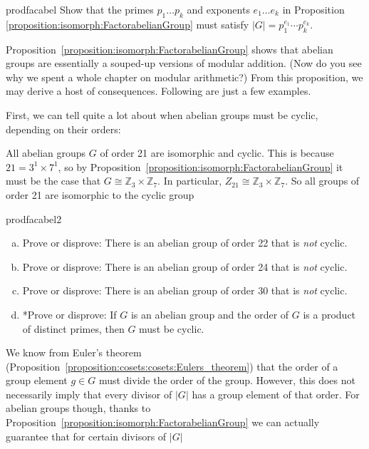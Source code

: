 \begin{exercise}{prodfacabel}
Show that the primes  $p_1 \ldots p_k$ and exponents $e_1 \ldots e_k$ in Proposition~ \ref{proposition:isomorph:FactorabelianGroup} must satisfy
$|G| = p_1^{e_1} \cdots p_k^{e_k}$.
\end{exercise}

Proposition~\ref{proposition:isomorph:FactorabelianGroup} shows that abelian groups are essentially a souped-up versions of modular addition.  (Now do you see why we spent a whole chapter on modular arithmetic?) From this proposition, we may derive a host of consequences.  Following are just a few examples.

First, we can tell quite a lot about when abelian groups must be cyclic, depending on their orders:

\begin{example}{}  All abelian groups $G$ of order 21 are isomorphic and cyclic. This is because $21 = 3^1 \times 7^1$, so by Proposition~\ref{proposition:isomorph:FactorabelianGroup} it must be the case that $G \cong {\mathbb Z}_3 \times {\mathbb Z}_7$. In particular,
 $Z_{21}  \cong {\mathbb Z}_3 \times {\mathbb Z}_7$. So all groups of order 21 are isomorphic to the cyclic group 
\end{example}

\begin{exercise}{prodfacabel2}
\begin{enumerate}[(a)] 
\item
Prove or disprove: There is an abelian group of order 22 that is \emph{not} cyclic. 
\item
Prove or disprove: There is an abelian group of order 24 that is \emph{not} cyclic. 
\item
Prove or disprove: There is an abelian group of order 30 that is \emph{not} cyclic.
\item
*Prove or disprove:  If $G$ is an abelian group and the order of $G$ is a product of distinct primes, then $G$ must be cyclic.
\end{enumerate}
\end{exercise}

We know from Euler's theorem (Proposition~\ref{proposition:cosets:cosets:Eulers_theorem}) that the order of a group element $g \in G$ must divide the order of the group. However, this does not necessarily imply that every divisor of $|G|$ has a group element of that order.  For abelian groups though, 
thanks to  Proposition~\ref{proposition:isomorph:FactorabelianGroup} we can actually guarantee that for certain divisors of $|G|$

